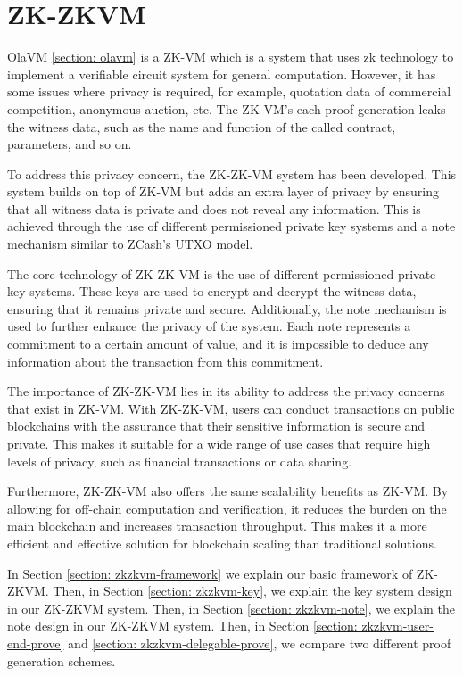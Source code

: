 \section{ZK-ZKVM} \label{sec:zkzkvm}

OlaVM \ref{section: olavm} is a ZK-VM which is a system that uses zk technology to implement a verifiable circuit system for general computation. However, it has some issues where privacy is required, for example, quotation data of commercial competition, anonymous auction, etc. The ZK-VM's each proof generation leaks the witness data, such as the name and function of the called contract, parameters, and so on.

To address this privacy concern, the ZK-ZK-VM system has been developed. This system builds on top of ZK-VM but adds an extra layer of privacy by ensuring that all witness data is private and does not reveal any information. This is achieved through the use of different permissioned private key systems and a note mechanism similar to ZCash's UTXO model.

The core technology of ZK-ZK-VM is the use of different permissioned private key systems. These keys are used to encrypt and decrypt the witness data, ensuring that it remains private and secure. Additionally, the note mechanism is used to further enhance the privacy of the system. Each note represents a commitment to a certain amount of value, and it is impossible to deduce any information about the transaction from this commitment.

The importance of ZK-ZK-VM lies in its ability to address the privacy concerns that exist in ZK-VM. With ZK-ZK-VM, users can conduct transactions on public blockchains with the assurance that their sensitive information is secure and private. This makes it suitable for a wide range of use cases that require high levels of privacy, such as financial transactions or data sharing.

Furthermore, ZK-ZK-VM also offers the same scalability benefits as ZK-VM. By allowing for off-chain computation and verification, it reduces the burden on the main blockchain and increases transaction throughput. This makes it a more efficient and effective solution for blockchain scaling than traditional solutions.

In Section \ref{section: zkzkvm-framework} we explain our basic framework of ZK-ZKVM. Then, in Section \ref{section: zkzkvm-key}, we explain the key system design in our ZK-ZKVM system. Then, in Section \ref{section: zkzkvm-note}, we explain the note design in our ZK-ZKVM system. Then, in Section \ref{section: zkzkvm-user-end-prove} and \ref{section: zkzkvm-delegable-prove}, we compare two different proof generation schemes.





